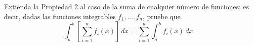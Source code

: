 \item Extienda la Propiedad 2 al caso de la suma de cualquier número de funciones; es decir, dadas las funciones integrables $f_1, \dots, f_n$, pruebe que
$$\int_a^b \left[ \sum_{i=1}^n f_i(x) \right] \, dx = \sum_{i=1}^n \int_a^b f_i(x) \, dx$$
